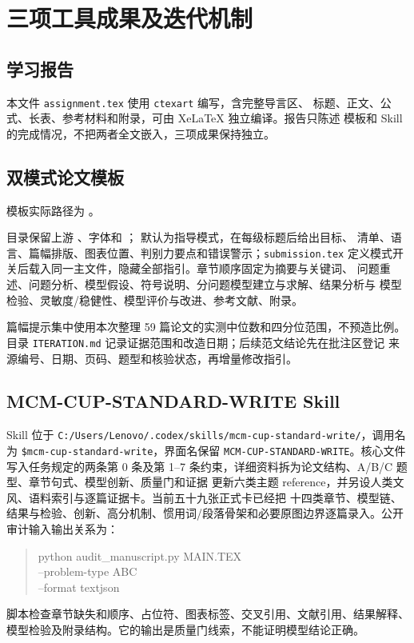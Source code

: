 \documentclass[UTF8,a4paper,12pt]{ctexart}
\begin{document}
\section{三项工具成果及迭代机制}

\subsection{学习报告}

本文件 \texttt{assignment.tex} 使用 \texttt{ctexart} 编写，含完整导言区、
标题、正文、公式、长表、参考材料和附录，可由 XeLaTeX 独立编译。报告只陈述
模板和 Skill 的完成情况，不把两者全文嵌入，三项成果保持独立。

\subsection{双模式论文模板}

模板实际路径为 。\par
目录保留上游
、字体和
； 默认为指导模式，在每级标题后给出目标、
清单、语言、篇幅排版、图表位置、判别力要点和错误警示；\texttt{submission.tex}
定义模式开关后载入同一主文件，隐藏全部指引。章节顺序固定为摘要与关键词、
问题重述、问题分析、模型假设、符号说明、分问题模型建立与求解、结果分析与
模型检验、灵敏度/稳健性、模型评价与改进、参考文献、附录。

篇幅提示集中使用本次整理 59 篇论文的实测中位数和四分位范围，不预造比例。目录
\texttt{ITERATION.md} 记录证据范围和改造日期；后续范文结论先在批注区登记
来源编号、日期、页码、题型和核验状态，再增量修改指引。

\subsection{MCM-CUP-STANDARD-WRITE Skill}

Skill 位于
\texttt{C:/Users/Lenovo/.codex/skills/mcm-cup-standard-write/}，调用名为
\texttt{\$mcm-cup-standard-write}，界面名保留
\texttt{MCM-CUP-STANDARD-WRITE}。核心文件写入任务规定的两条第 0 条及第 1--7
条约束，详细资料拆为论文结构、A/B/C 题型、章节句式、模型创新、质量门和证据
更新六类主题 reference，并另设人类文风、语料索引与逐篇证据卡。当前五十九张正式卡已经把
十四类章节、模型链、结果与检验、创新、高分机制、惯用词/段落骨架和必要原图边界逐篇录入。公开审计输入输出关系为：
\begin{quote}
\small\ttfamily
python audit\_manuscript.py MAIN.TEX\\
\hspace*{1em}--problem-type A\textbar B\textbar C\\
\hspace*{1em}--format text\textbar json
\end{quote}
脚本检查章节缺失和顺序、占位符、图表标签、交叉引用、文献引用、结果解释、
模型检验及附录结构。它的输出是质量门线索，不能证明模型结论正确。
\end{document}
